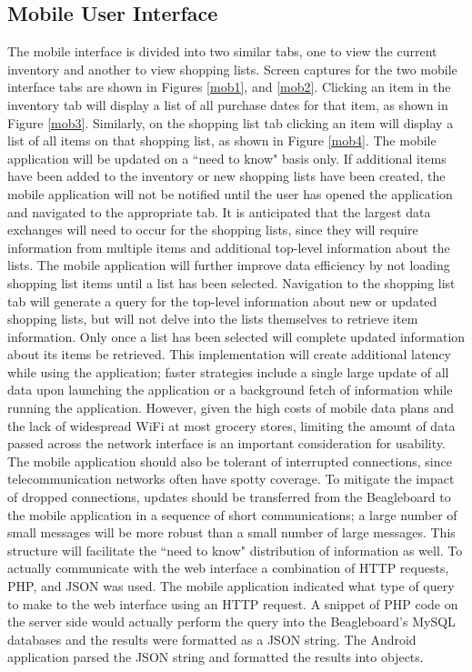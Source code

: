 \documentclass[11pt]{article} %
\begin{document}
\subsection{Mobile User Interface}
The mobile interface is divided into two similar tabs, one to view the current inventory and another to view shopping lists. Screen captures for the two mobile interface tabs are shown in Figures \ref{mob1}, and \ref{mob2}. Clicking an item in the inventory tab will display a list of all purchase dates for that item, as shown in Figure \ref{mob3}. Similarly, on the shopping list tab clicking an item will display a list of all items on that shopping list, as shown in Figure \ref{mob4}. The mobile application will be updated on a ``need to know" basis only. If additional items have been added to the inventory or new shopping lists have been created, the mobile application will not be notified until the user has opened the application and navigated to the appropriate tab. It is anticipated that the largest data exchanges will need to occur for the shopping lists, since they will require information from multiple items and additional top-level information about the lists. The mobile application will further improve data efficiency by not loading shopping list items until a list has been selected. Navigation to the shopping list tab will generate a query for the top-level information about new or updated shopping lists, but will not delve into the lists themselves to retrieve item information. Only once a list has been selected will complete updated information about its items be retrieved. This implementation will create additional latency while using the application; faster strategies include a single large update of all data upon launching the application or a background fetch of information while running the application. However, given the high costs of mobile data plans and the lack of widespread WiFi at most grocery stores, limiting the amount of data passed across the network interface is an important consideration for usability.
\newline \quad \newline
The mobile application should also be tolerant of interrupted connections, since telecommunication networks often have spotty coverage. To mitigate the impact of dropped connections, updates should be transferred from the Beagleboard to the mobile application in a sequence of short communications; a large number of small messages will be more robust than a small number of large messages. This structure will facilitate the ``need to know" distribution of information as well.
\newline \quad \newline
To actually communicate with the web interface a combination of HTTP requests, PHP, and JSON was used. The mobile application indicated what type of query to make to the web interface using an HTTP request. A snippet of PHP code on the server side would actually perform the query into the Beagleboard's MySQL databases and the results were formatted as a JSON string. The Android application parsed the JSON string and formatted the results into objects.
\end{document}
